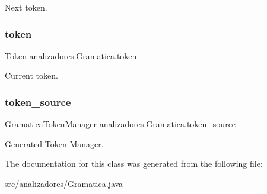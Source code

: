 Next token. \mbox{\label{classanalizadores_1_1_gramatica_afceaf2a819c239c3f6ac455202a7bc58}} 
\subsubsection{\texorpdfstring{token}{token}}
{\footnotesize\ttfamily \mbox{\hyperlink{classanalizadores_1_1_token}{Token}} analizadores.\+Gramatica.\+token}

Current token. \mbox{\label{classanalizadores_1_1_gramatica_a8f84a648c3c52e76b9dda324de4e8fb8}} 
\subsubsection{\texorpdfstring{token\+\_\+source}{token\_source}}
{\footnotesize\ttfamily \mbox{\hyperlink{classanalizadores_1_1_gramatica_token_manager}{Gramatica\+Token\+Manager}} analizadores.\+Gramatica.\+token\+\_\+source}

Generated \mbox{\hyperlink{classanalizadores_1_1_token}{Token}} Manager. 

The documentation for this class was generated from the following file\+:\begin{DoxyCompactItemize}
\item 
src/analizadores/Gramatica.\+java\end{DoxyCompactItemize}
